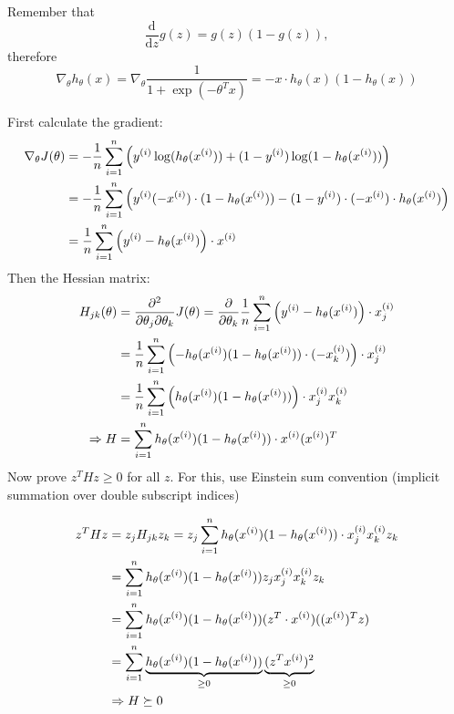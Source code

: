 \begin{answer}
Remember that
\begin{equation*}
    \frac{\mathrm{d}}{\mathrm{d}z}g(z) = g(z)(1-g(z)),
\end{equation*}
therefore
\begin{equation*}
    \nabla_{\theta} h_\theta(x) =  \nabla_{\theta} \frac{1}{1+\exp\left(-\theta^Tx\right)} = - x\cdot h_\theta(x) (1 - h_\theta(x))
\end{equation*}

First calculate the gradient:
\begin{align*}
    \nabla_{\theta}J(\theta) &= -\frac{1}{{n}} \sum_{i=1}^{n} \left(y^{(i)}\log(h_{\theta}(x^{(i)}))
    +  (1 - y^{(i)})\log(1 - h_{\theta}(x^{(i)}))\right) \\
    &= -\frac{1}{{n}} \sum_{i=1}^{n} \left(y^{(i)} (-x^{(i)})\cdot (1- h_\theta(x^{(i)}))
    -  (1 - y^{(i)})\cdot(-x^{(i)})\cdot h_\theta(x^{(i)})\right) \\
    &= \frac{1}{{n}} \sum_{i=1}^{n} \left(y^{(i)} - h_\theta(x^{(i)})\right)\cdot x^{(i)} \\
\end{align*}
Then the Hessian matrix:
\begin{align*}
    H_{jk}(\theta) &= \frac{\partial^2}{\partial\theta_j\partial\theta_k} J(\theta)
    = \frac{\partial}{\partial\theta_k} \frac{1}{{n}} \sum_{i=1}^{n} \left(y^{(i)} - h_\theta(x^{(i)})\right)\cdot x^{(i)}_j \\
    &= \frac{1}{{n}} \sum_{i=1}^{n} \left(- h_\theta(x^{(i)}) (1-h_\theta(x^{(i)}))\cdot (-x^{(i)}_k)\right)\cdot x^{(i)}_j \\
    &= \frac{1}{{n}} \sum_{i=1}^{n} \left(h_\theta(x^{(i)}) (1-h_\theta(x^{(i)}))\right)\cdot x^{(i)}_jx^{(i)}_k \\
    \Rightarrow H &= \sum_{i=1}^{n} h_\theta(x^{(i)}) (1-h_\theta(x^{(i)})) \cdot x^{(i)} (x^{(i)})^T
\end{align*}
Now prove $z^THz\geq 0$ for all $z$. For this, use Einstein sum convention (implicit summation over double subscript indices)

\begin{align*}
    z^THz &= z_j H_{jk} z_k = z_j \sum_{i=1}^{n} h_\theta(x^{(i)}) (1-h_\theta(x^{(i)})) \cdot x^{(i)}_j x^{(i)}_k z_k \\
    &= \sum_{i=1}^{n} h_\theta(x^{(i)}) (1-h_\theta(x^{(i)})) z_jx^{(i)}_j x^{(i)}_k z_k \\
    &= \sum_{i=1}^{n} h_\theta(x^{(i)}) (1-h_\theta(x^{(i)})) (z^T\cdot x^{(i)}) ((x^{(i)})^T z) \\
    &= \sum_{i=1}^{n} \underbrace{h_\theta(x^{(i)}) (1-h_\theta(x^{(i)}))}_{\geq 0} \underbrace{(z^T x^{(i)})^2}_{\geq 0}  \\
    &\Rightarrow H \succeq 0 \\
\end{align*}
\end{answer}
